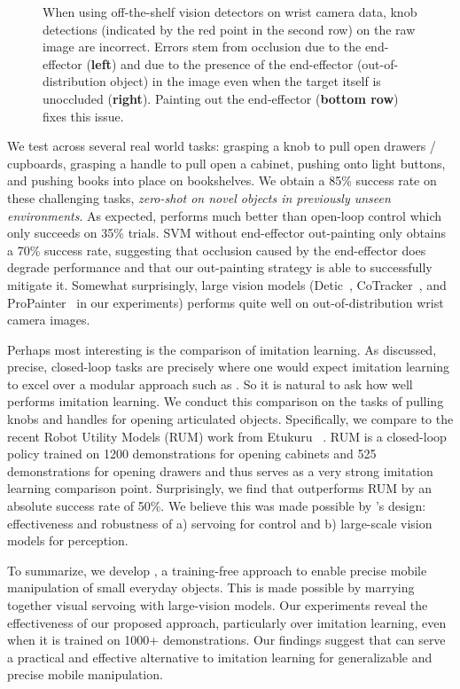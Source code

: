 \begin{figure}
\setlength{\tabcolsep}{2pt}
\caption{When using off-the-shelf vision detectors on wrist camera data, knob detections (indicated by the {\color{red} red point} in the second row) on the raw image are incorrect. Errors stem from occlusion due to the end-effector ({\bf left}) and due to the presence of the end-effector (out-of-distribution object) in the image even when the target itself is unoccluded ({\bf right}). Painting out the end-effector ({\bf bottom row}) fixes this issue.}
\end{figure}





We test \name across several real world tasks: grasping a knob to pull open
drawers / cupboards, grasping a handle to pull open a cabinet, pushing onto
light buttons, and pushing books into place on bookshelves. We obtain a 
85\% success rate on these challenging tasks, \textit{zero-shot on novel objects
in previously unseen environments}. As expected, \name performs much better than
open-loop control which only succeeds on 35\% trials. SVM without end-effector 
out-painting only obtains a 70\% success rate, suggesting that occlusion
caused by the end-effector does degrade performance and that our out-painting 
strategy is able to successfully mitigate it. Somewhat surprisingly, large vision models (Detic~\cite{zhou2022detecting}, CoTracker~\cite{karaev2023cotracker}, and ProPainter~\cite{zhou2023propainter} in our experiments)
performs quite well on out-of-distribution wrist camera images. 

Perhaps most interesting is the comparison of \name \vs imitation learning. 
As discussed, precise, closed-loop tasks are precisely where one
would expect imitation learning to excel over a modular approach such as \name.
So it is natural to ask how well \name performs \vs imitation learning. We
conduct this comparison on the tasks of pulling knobs and handles for opening
articulated objects. Specifically, we compare to the recent Robot Utility Models
(RUM) work from Etukuru \etal~\cite{etukuru2024robot}. RUM is a closed-loop policy
trained on 1200
demonstrations for opening cabinets and 525 demonstrations for opening drawers
and thus serves as a very strong imitation learning comparison point. Surprisingly, we find that \name outperforms RUM by an absolute success rate of
50\%. We believe this was made possible by \name's design: effectiveness and
robustness of a) servoing for control and b) large-scale vision models for perception.



To summarize, we develop \name, a training-free approach to enable precise
mobile manipulation of small everyday objects. This is made possible by
marrying together visual servoing with large-vision models. Our experiments
reveal the effectiveness of our proposed approach, particularly over imitation
learning, 
even when it is trained
on 1000+ demonstrations. 
Our findings suggest that \name can serve
a practical and
effective alternative to imitation learning for 
generalizable and precise mobile manipulation.
